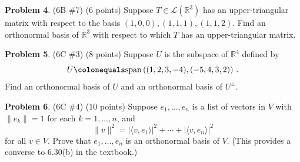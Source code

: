 \documentclass[reqno, 12pt]{amsart}
\theoremstyle{definition}
\newenvironment{problab}[1]
{\noindent\textbf{Problem #1}.}
{\vskip 6pt}
\theoremstyle{remark}
\newcommand{\R}{\mathbb R}
\renewcommand{\L}{\mathcal L}
\newcommand{\SSpan}{\text{span}}
\newcommand{\la}{\langle}
\newcommand{\ra}{\rangle}
\begin{document}
\begin{problab}{4} (6B \#7) (6 points)
  Suppose $T \in \L(\R^3)$ has an upper-triangular matrix with respect to the basis $(1,0,0), (1,1,1), (1,1,2)$. Find an orthonormal basis of $\R^3$ with respect to which $T$ has an upper-triangular matrix.
\end{problab}

\begin{problab}{5} (6C \#3) (8 points)
  Suppose $U$ is the subspace of $\R^4$ defined by
  \begin{equation*}
    U \colonequals \SSpan\left( (1,2,3,-4), (-5,4,3,2) \right) \, .
  \end{equation*}
  Find an orthonormal basis of $U$ and an orthonormal basis of $U^\perp$.
\end{problab}

\begin{problab}{6} (6C \#4) (10 points)
  Suppose $e_1, \ldots, e_n$ is a list of vectors in $V$ with $\|e_k\| = 1$ for each $k = 1, \ldots, n$, and
  \begin{equation*}
    \|v\|^2 = |\la v, e_1 \ra|^2 + \cdots + |\la v, e_n \ra|^2
  \end{equation*}
  for all $v \in V$. Prove that $e_1, \ldots, e_n$ is an orthonormal basis of $V$. (This provides a converse to 6.30(b) in the textbook.)
\end{problab}
\end{document}
